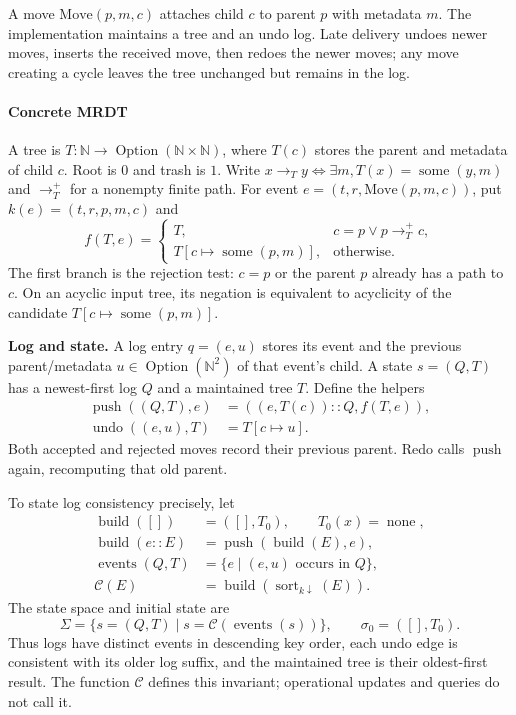 A move $\mathrm{Move}(p,m,c)$ attaches child $c$ to parent $p$ with metadata
$m$. The implementation maintains a tree and an undo log. Late delivery
undoes newer moves, inserts the received move, then redoes the newer moves;
any move creating a cycle leaves the tree unchanged but remains in the log.

\paragraph{Concrete MRDT}
A tree is $T:\mathbb N\to\operatorname{Option}(\mathbb N\times\mathbb N)$,
where $T(c)$ stores the parent and metadata of child $c$. Root is $0$ and
trash is $1$. Write $x\to_T y\iff\exists m,T(x)=\operatorname{some}(y,m)$
and $\to_T^+$ for a nonempty finite path. For event
$e=(t,r,\mathrm{Move}(p,m,c))$, put $k(e)=(t,r,p,m,c)$ and
\[
f(T,e)=\begin{cases}
T,&c=p\lor p\to_T^+c,\\
T[c\mapsto\operatorname{some}(p,m)],&\text{otherwise}.
\end{cases}
\]
The first branch is the rejection test: $c=p$ or the parent $p$ already
has a path to $c$. On an acyclic input tree, its negation is equivalent to
acyclicity of the candidate $T[c\mapsto\operatorname{some}(p,m)]$.

\textbf{Log and state.} A log entry $q=(e,u)$ stores its event and the
previous parent/metadata $u\in\operatorname{Option}(\mathbb N^2)$ of that
event's child. A state $s=(Q,T)$ has a newest-first log $Q$ and a maintained
tree $T$. Define the helpers
\[
\begin{aligned}
\operatorname{push}((Q,T),e)&=((e,T(c))::Q,f(T,e)),\\
\operatorname{undo}((e,u),T)&=T[c\mapsto u].
\end{aligned}
\]
Both accepted and rejected moves record their previous parent. Redo calls
$\operatorname{push}$ again, recomputing that old parent.

To state log consistency precisely, let
\[
\begin{aligned}
\operatorname{build}([])&=([],T_0),\qquad T_0(x)=\operatorname{none},\\
\operatorname{build}(e::E)&=\operatorname{push}(\operatorname{build}(E),e),\\
\operatorname{events}(Q,T)&=\{e\mid(e,u)\text{ occurs in }Q\},\\
\mathcal C(E)&=\operatorname{build}(\operatorname{sort}_{k\downarrow}(E)).
\end{aligned}
\]
The state space and initial state are
\[
\Sigma=\{s=(Q,T)\mid s=\mathcal C(\operatorname{events}(s))\},
\qquad\sigma_0=([],T_0).
\]
Thus logs have distinct events in descending key order, each undo edge is
consistent with its older log suffix, and the maintained tree is their
oldest-first result. The function $\mathcal C$ defines this invariant;
operational updates and queries do not call it.

